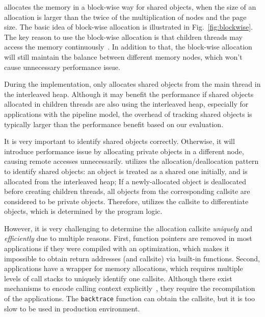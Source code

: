 \NA{} allocates the memory in a block-wise way for shared objects, when the size of an allocation is larger than the twice of the multiplication of nodes and the page size. The basic idea of block-wise allocation is illustrated in Fig.~\ref{fig:blockwise}. The key reason to use the block-wise allocation is that children threads may access the memory continuously~\cite{XULIU}. In addition to that, the block-wise allocation will still maintain the balance between different memory nodes, which won't cause unnecessary performance issue. 
 
During the implementation, \NA{} only allocates shared objects from the main thread in the interleaved heap. Although it may benefit the performance if shared objects allocated in children threads are also using the interleaved heap, especially for applications with the pipeline model, the overhead of tracking shared objects is typically larger than the performance benefit based on our evaluation. 

It is very important to identify shared objects correctly. Otherwise, it will introduce performance issue by allocating private objects in a different node, causing remote accesses unnecessarily. \NA{} utilizes the allocation/deallocation pattern to identify shared objects: an object is treated as a shared one initially, and is allocated from the interleaved heap; If a newly-allocated object is deallocated before creating children threads, all objects from the corresponding callsite are considered to be private objects. Therefore, \NA{} utilizes the callsite to differentiate objects, which is determined by the program logic.  

However, it is very challenging to determine the allocation callsite \textit{uniquely} and \textit{efficiently} due to multiple reasons. First, function pointers are removed in most applications if they were compiled with an optimization, which makes it impossible to obtain return addresses (and callsite) via built-in functions. Second, applications have a wrapper for memory allocations, which requires multiple levels of call stacks to uniquely identify one callsite. Although there exist mechanisms to encode calling context explicitly~\cite{DBLP:conf/icse/SumnerZWZ10, DBLP:conf/cgo/ZengR0AJ014}, they require the recompilation of the applications. The \texttt{backtrace} function can obtain the callsite, but it is too slow to be used in production environment.


